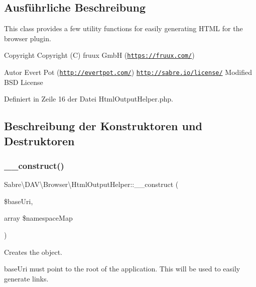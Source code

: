 \subsection{Ausführliche Beschreibung}
This class provides a few utility functions for easily generating H\+T\+ML for the browser plugin.

\begin{DoxyCopyright}{Copyright}
Copyright (C) fruux GmbH (\href{https://fruux.com/}{\tt https\+://fruux.\+com/}) 
\end{DoxyCopyright}
\begin{DoxyAuthor}{Autor}
Evert Pot (\href{http://evertpot.com/}{\tt http\+://evertpot.\+com/})  \href{http://sabre.io/license/}{\tt http\+://sabre.\+io/license/} Modified B\+SD License 
\end{DoxyAuthor}


Definiert in Zeile 16 der Datei Html\+Output\+Helper.\+php.



\subsection{Beschreibung der Konstruktoren und Destruktoren}
\mbox{\label{class_sabre_1_1_d_a_v_1_1_browser_1_1_html_output_helper_a7c5605a84a03a7c8eaa945d9398b7696}} 
\subsubsection{\texorpdfstring{\+\_\+\+\_\+construct()}{\_\_construct()}}
{\footnotesize\ttfamily Sabre\textbackslash{}\+D\+A\+V\textbackslash{}\+Browser\textbackslash{}\+Html\+Output\+Helper\+::\+\_\+\+\_\+construct (\begin{DoxyParamCaption}\item[{}]{\$base\+Uri,  }\item[{array}]{\$namespace\+Map }\end{DoxyParamCaption})}

Creates the object.

base\+Uri must point to the root of the application. This will be used to easily generate links.

